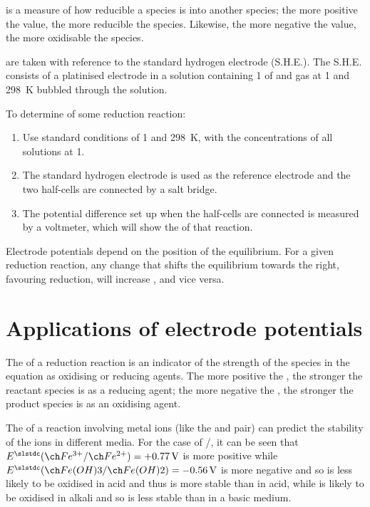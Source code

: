 \documentclass[Chemistry.tex]{subfiles}
\begin{document}
\slEo{} is a measure of how reducible a species is into another species; the more positive the value, the more reducible the species. Likewise, the more negative the value, the more oxidisable the species.

\slEo{} are taken with reference to the standard hydrogen electrode (S.H.E.). The S.H.E. consists of a platinised  electrode in a solution containing \SI{1}{\molar} of  and  gas at \SI{1}{\atmosphere} and \SI{298}{\kelvin} bubbled through the solution.

To determine \slEo{} of some reduction reaction:
\begin{enumerate}[start=1]
\item Use standard conditions of \SI{1}{\atmosphere} and \SI{298}{\kelvin}, with the concentrations of all solutions at \SI{1}{\molar}.
\item The standard hydrogen electrode is used as the reference electrode and the two half-cells are connected by a salt bridge.
\item The potential difference set up when the half-cells are connected is measured by a voltmeter, which will show the \slEo{} of that reaction.
\end{enumerate}

Electrode potentials depend on the position of the equilibrium. For a given reduction reaction, any change that shifts the equilibrium towards the right, favouring reduction, will increase \slEo, and vice versa.
\section{Applications of electrode potentials}\label{sec:6-2.appeo}
The \slEo{} of a reduction reaction is an indicator of the strength of the species in the equation as oxidising or reducing agents. The more positive the \slEo, the stronger the reactant species is as a reducing agent; the more negative the \slEo, the stronger the product species is as an oxidising agent.

The \slEo{} of a reaction involving metal ions (like the  and  pair) can predict the stability of the ions in different media. For the case of /, it can be seen that \(\slEorr{Fe^{3+}}{Fe^{2+}} = +\SI{0.77}{\volt}\) is more positive while \(\slEorr{Fe(OH)3}{Fe(OH)2} = -\SI{0.56}{\volt}\) is more negative and so  is less likely to be oxidised in acid and thus is more stable than  in acid, while  is likely to be oxidised in alkali and so is less stable than  in a basic medium.
\end{document}
